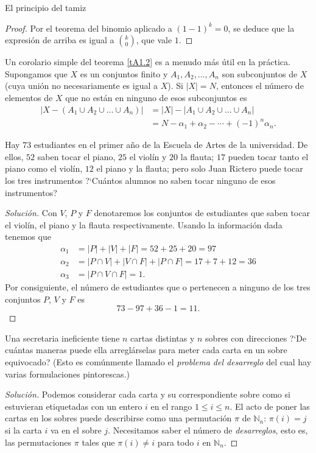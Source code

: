 \begin{section}{El principio del tamiz}
\begin{proof}
Por el teorema del binomio aplicado a $(1-1)^k=0$, se deduce que la expresión de arriba  es igual a
$\binom{k}{0}$, que vale $1$.
\end{proof}

Un corolario simple del teorema \ref{tA1.2} es a menudo más útil en la práctica. Supongamos que $X$ es un conjuntos finito y $A_1,A_2,\ldots,A_n$ son subconjuntos de $X$ (cuya unión no necesariamente es igual a $X$). Si $|X| = N$, entonces el número de elementos de $X$ que no están en ninguno de esos subconjuntos es
$$\begin{aligned}
|X-(A_1 \cup A_2 \cup \ldots \cup A_n)|&=
|X|-|A_1 \cup A_2 \cup \ldots \cup A_n| \\
&= N- \alpha_1 + \alpha_2 - \cdots + (-1)^n\alpha_n.
\end{aligned}
$$

\begin{ejemplo*} Hay $73$ estudiantes en el primer año de la Escuela de Artes de la universidad. De ellos, $52$ saben tocar el piano, $25$ el violín y $20$ la flauta; $17$ pueden tocar tanto el piano como el violín, $12$ el piano y la flauta; pero solo Juan Rictero puede tocar los tres instrumentos ?`Cuántos alumnos no saben tocar ninguno de esos instrumentos?
\end{ejemplo*}
\begin{proof}[Solución] Con $V$, $P$ y $F$ denotaremos los conjuntos de estudiantes que saben tocar el violín, el piano y la flauta respectivamente. Usando la información dada tenemos que $$
\begin{aligned}
\alpha_1&= |P| + |V| + |F|= 52+25+20=97 \\
\alpha_2&= |P\cap V| + |V\cap F| + |P\cap F|=17+7+12=36 \\
\alpha_3&= |P\cap V\cap F|= 1.
\end{aligned}
$$
Por consiguiente, el número de estudiantes que o pertenecen a ninguno de los tres conjuntos $P$, $V$ y $F$ es
$$
73-97+36-1=11.
$$
\end{proof}

\begin{ejemplo*} Una secretaria ineficiente tiene $n$ cartas distintas y $n$ sobres con direcciones ?`De cuántas maneras puede ella arreglárselas para meter cada carta en un sobre equivocado? (Esto es comúnmente llamado el \textit{problema del desarreglo} del cual hay varias formulaciones pintorescas.) 
\end{ejemplo*}


\begin{proof}[Solución] Podemos considerar cada carta y su correspondiente sobre  como si estuvieran etiquetadas con un entero $i$ en el rango $1 \le i \le n$. El acto de poner las cartas en los sobres puede describirse como una permutación $\pi$  de $\mathbb N_n$: $\pi(i)=j$ si la carta $i$ va en el sobre $j$. Necesitamos saber  el número de \textit{desarreglos}, esto es, las permutaciones $\pi$ tales que
$\pi(i)\not=i$ para todo $i$ en $\mathbb N_n$.


\end{proof}
\end{section}
